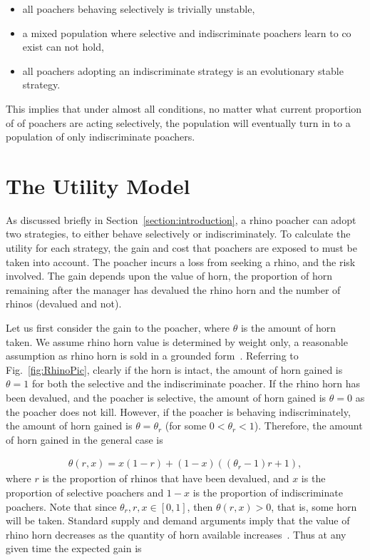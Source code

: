 \documentclass[10pt]{article}
\begin{document}
\begin{itemize}
    \item all poachers behaving selectively is trivially unstable,
    \item a mixed population where selective and indiscriminate poachers
          learn to co exist can not hold,
    \item all poachers adopting an indiscriminate strategy is an evolutionary
          stable strategy.
\end{itemize}

This implies that under almost all conditions, no matter what current proportion
of
of poachers are acting selectively, the population will eventually turn in to a
population of only indiscriminate poachers.

\section{The Utility Model}\label{section:the_model}

As discussed briefly in Section~\ref{section:introduction}, a rhino poacher
can adopt two strategies, to either behave selectively
or indiscriminately. To calculate the utility for each strategy, the gain and cost
that poachers are exposed to must be taken into account. The poacher incurs a
loss from seeking a rhino, and the risk involved. The gain depends upon the value
of horn, the proportion of horn remaining after the manager has devalued the 
rhino horn and the number of rhinos (devalued and not).

Let us first consider the gain to the poacher, where \(\theta\) is the amount of
horn taken. We assume rhino horn value is determined by weight only, a 
reasonable assumption as rhino horn is sold in a grounded form~\cite{Saverhino}.
Referring to Fig.~\ref{fig:RhinoPic}, clearly if the horn is intact, the amount of
horn gained is \(\theta=1\) for both the selective and the indiscriminate poacher.
If the rhino horn has been devalued, and the poacher is selective, the amount of
horn gained is \(\theta=0\) as the poacher does not kill. However, if the poacher
is behaving indiscriminately, the amount of horn gained is \(\theta = \theta_r\)
(for some \(0<\theta_r<1\)). Therefore, the amount of horn gained in the 
general case is

\begin{eqnarray}
    \label{eqn:theta}
    \theta(r, x) = x (1 - r) + (1 - x) ((\theta_r - 1) r + 1),
\end{eqnarray}
where \(r\) is the proportion of rhinos that have been devalued, and \(x\) is the
proportion of selective poachers and \(1-x\) is the proportion of indiscriminate
poachers. Note that since \(\theta_r, r, x  \in [0, 1]\), then
\(\theta(r, x) > 0\), that is, some horn will be taken. Standard supply and demand
arguments imply that the value
of rhino horn decreases as the quantity of horn available increases~\cite{mankiw2010}.
Thus at any given time the expected gain is
\end{document}
